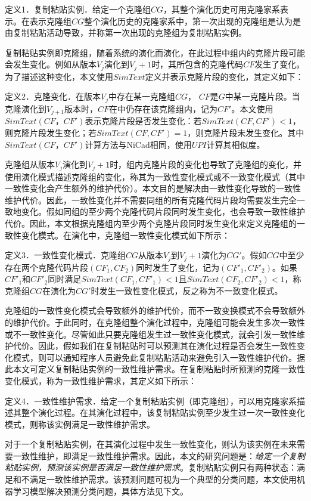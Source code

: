 定义1．复制粘贴实例．给定一个克隆组$CG$，其整个演化历史可用克隆家系表示。在表示克隆组$CG$整个演化历史的克隆家系中，第一次出现的克隆组是认为是由复制粘贴活动导致，并称第一次出现的克隆组为复制粘贴实例。


复制粘贴实例即克隆组，随着系统的演化而演化，在此过程中组内的克隆片段可能会发生变化。例如从版本$V_j$演化到$V_j+1$时，其所包含的克隆代码$CF$发生了变化。为了描述这种变化，本文使用$SimText$定义并表示克隆片段的变化，其定义如下：


定义2．克隆变化．在版本$V_j$中存在某一克隆组$CG$， $CF$是$G$中某一克隆片段。当克隆演化到$V_{j+1}$版本时，$CF$在中仍存在该克隆组内，记为$CF'$。本文使用$SimText(CF，CF')$表示克隆片段是否发生变化：若$SimText(CF,CF')<1$，则克隆片段发生变化；若$SimText(CF,CF')=1$，则克隆片段未发生变化。其中$SimText(CF，CF')$计算方法与NiCad相同，使用$UPI$计算其相似度。


克隆组从版本$V_j$演化到$V_j+1$时，组内克隆片段的变化也导致了克隆组的变化，并使用演化模式描述克隆组的变化，称其为一致性变化模式或不一致变化模式（其中一致性变化会产生额外的维护代价）。本文目的是解决由一致性变化导致的一致性维护代价。因此，一致性变化并不需要同组的所有克隆代码片段均需要发生完全一致地变化。假如同组的至少两个克隆代码片段同时发生变化，也会导致一致性维护代价。因此，本文根据克隆组内至少两个克隆片段同时发生变化来定义克隆组的一致性变化模式。在演化中，克隆组一致性变化模式如下所示：


定义3．一致性变化模式．克隆组$CG$从版本$V_j$到$V_j+1$演化为$CG'$。假如$CG$中至少存在两个克隆代码片段$(CF_1,CF_2)$同时发生了变化，记为$(CF'_1,CF'_2)$。如果$CF'_1$和$CF'_2$同时满足$SimText(CF_1,CF'_1)<1$且$SimText(CF_2,CF'_2)<1$，称克隆组$CG$在演化为$CG'$时发生一致性变化模式，反之称为不一致变化模式。


克隆组的一致性变化模式会导致额外的维护代价，而不一致变换模式不会导致额外的维护代价。于此同时，在克隆组整个演化过程中，克隆组可能会发生多次一致性或不一致性变化。尽管如此只要克隆组发生过一致性变化模式，就会引发一致性维护代价。因此，假如我们在复制粘贴时可以预测其在演化过程是否会发生一致性变化模式，则可以通知程序人员避免此复制粘贴活动来避免引入一致性维护代价。据此本文可定义复制粘贴实例的一致性维护需求。在复制粘贴时所预测的克隆一致性变化模式，称为一致性维护需求，其定义如下所示：


定义4．一致性维护需求．给定一个复制粘贴实例（即克隆组），可以用克隆家系描述其整个演化过程。在其演化过程中，该复制粘贴实例至少发生过一次一致性变化模式，则称该实例满足一致性维护需求。


对于一个复制粘贴实例，在其演化过程中发生一致性变化，则认为该实例在未来需要一致性维护，即满足一致性维护需求。因此，本文的研究问题是：{\em 给定一个复制粘贴实例，预测该实例是否满足一致性维护需求}。复制粘贴实例只有两种状态：满足和不满足一致性维护需求。该预测问题可视为一个典型的分类问题，本文使用机器学习模型解决预测分类问题，具体方法见下文。

